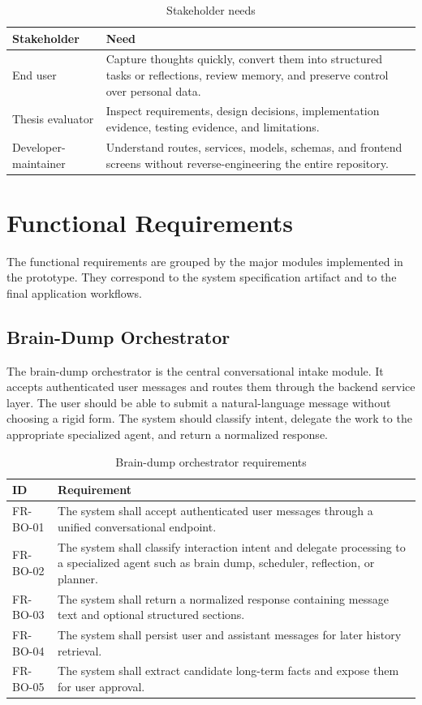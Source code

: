 \begin{table}[H]
\centering
\caption{Stakeholder needs}
\label{tab:stakeholder-needs}
\begin{tabular}{|p{}|p{}|}
\hline
\textbf{Stakeholder} & \textbf{Need}\\
\hline
End user & Capture thoughts quickly, convert them into structured tasks or reflections, review memory, and preserve control over personal data.\\
\hline
Thesis evaluator & Inspect requirements, design decisions, implementation evidence, testing evidence, and limitations.\\
\hline
Developer-maintainer & Understand routes, services, models, schemas, and frontend screens without reverse-engineering the entire repository.\\
\hline
\end{tabular}
\end{table}

\section{Functional Requirements}

The functional requirements are grouped by the major modules implemented in the prototype. They correspond to the system specification artifact and to the final application workflows.

\subsection{Brain-Dump Orchestrator}

The brain-dump orchestrator is the central conversational intake module. It accepts authenticated user messages and routes them through the backend service layer. The user should be able to submit a natural-language message without choosing a rigid form. The system should classify intent, delegate the work to the appropriate specialized agent, and return a normalized response.

\begin{longtable}{|p{}|p{}|}
\caption{Brain-dump orchestrator requirements}
\label{tab:brain-dump-req}\\
\hline
\textbf{ID} & \textbf{Requirement}\\
\hline
FR-BO-01 & The system shall accept authenticated user messages through a unified conversational endpoint.\\
\hline
FR-BO-02 & The system shall classify interaction intent and delegate processing to a specialized agent such as brain dump, scheduler, reflection, or planner.\\
\hline
FR-BO-03 & The system shall return a normalized response containing message text and optional structured sections.\\
\hline
FR-BO-04 & The system shall persist user and assistant messages for later history retrieval.\\
\hline
FR-BO-05 & The system shall extract candidate long-term facts and expose them for user approval.\\
\hline
\end{longtable}

